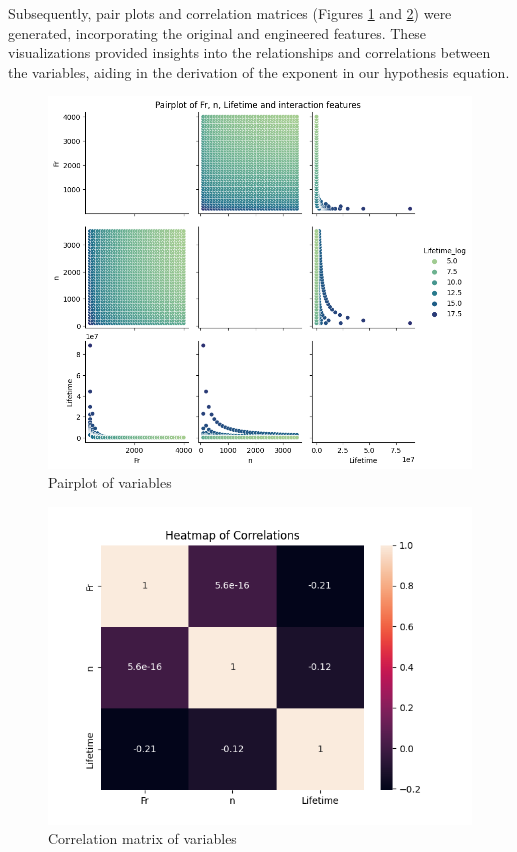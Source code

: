 Subsequently, pair plots and correlation matrices (Figures \ref{fig:bearings-pairplot} and \ref{fig:bearings-corrmat}) were generated, incorporating the original and engineered features. These visualizations provided insights into the relationships and correlations between the variables, aiding in the derivation of the exponent in our hypothesis equation.

\begin{figure}[ht]
    \centering
    \includegraphics[width=\textwidth]{assets/bearings-eda/pairplot.png}
    \caption{Pairplot of variables}
    \label{fig:bearings-pairplot}
\end{figure}

\begin{figure}[ht]
    \centering
    \includegraphics[width=\textwidth]{assets/bearings-eda/correlation-matrix.png}
    \caption{Correlation matrix of variables}
    \label{fig:bearings-corrmat}
\end{figure}

